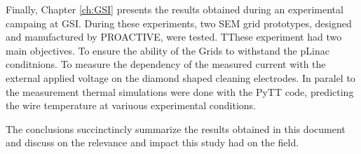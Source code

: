 Finally, Chapter \ref{ch:GSI} presents the results obtained during an experimental campaing at GSI. During these experiments, two SEM grid prototypes, designed and manufactured by PROACTIVE, were tested. TThese experiment had two main objectives. To ensure the ability of the Grids to withstand the pLinac conditnions. To measure the dependency of the measured current with the external applied voltage on the diamond shaped cleaning electrodes.  In paralel to the measurement thermal simulations were done with the PyTT code, predicting the wire temperature at variuous experimental conditions. 

The conclusions succinctincly summarize the results obtained in this document and discuss on the relevance and impact this study had on the field. 